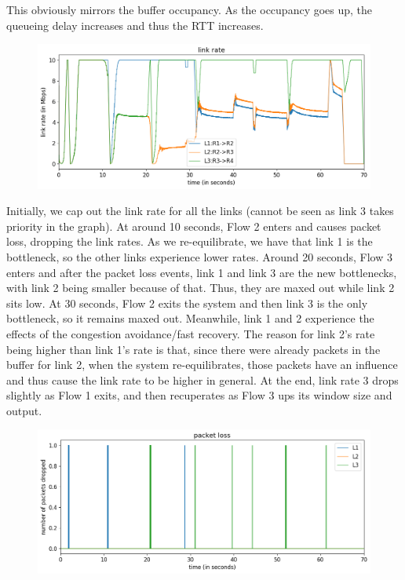 \documentclass{article}
\begin{document}
This obviously mirrors the buffer occupancy. As the occupancy goes up, the queueing delay increases and thus the RTT increases.

\begin{figure}[H]
\centering
\includegraphics[width = \textwidth]{test_case2_reno link rate.png}
\end{figure}

Initially, we cap out the link rate for all the links (cannot be seen as link 3 takes priority in the graph). At around 10 seconds, Flow 2 enters and causes packet loss, dropping the link rates. As we re-equilibrate, we have that link 1 is the bottleneck, so the other links experience lower rates. Around 20 seconds, Flow 3 enters and after the packet loss events, link 1 and link 3 are the new bottlenecks, with link 2 being smaller because of that. Thus, they are maxed out while link 2 sits low. At 30 seconds, Flow 2 exits the system and then link 3 is the only bottleneck, so it remains maxed out. Meanwhile, link 1 and 2 experience the effects of the congestion avoidance/fast recovery. The reason for link 2's rate being higher than link 1's rate is that, since there were already packets in the buffer for link 2, when the system re-equilibrates, those packets have an influence and thus cause the link rate to be higher in general. At the end, link rate 3 drops slightly as Flow 1 exits, and then recuperates as Flow 3 ups its window size and output.

\begin{figure}[H]
\centering
\includegraphics[width = \textwidth]{test_case2_reno packet loss.png}
\end{figure}
\end{document}
